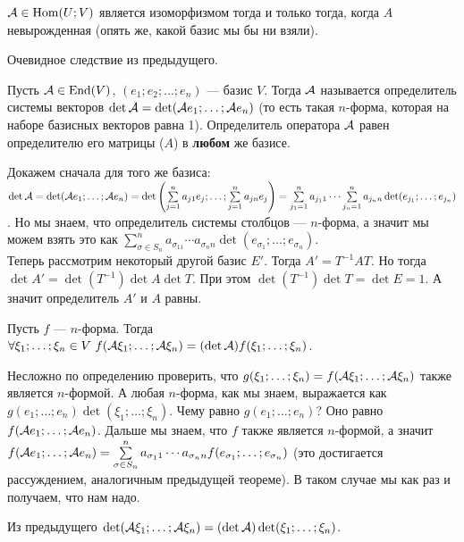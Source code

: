 \documentclass{article}
\begin{document}
\begin{itemize}
\begin{Proof}
        \end{Proof}
        \thm ${\mathcal{A}}\in\operatorname{Hom}(U;V)$ является изоморфизмом тогда и только тогда, когда $A$ невырожденная (опять же, какой базис мы бы ни взяли).
        \begin{Proof}
            Очевидное следствие из предыдущего.
        \end{Proof}
    \dfn Пусть ${\mathcal{A}}\in\operatorname{End}(V)$, $(e_1;e_2;\ldots;e_n)$ --- базис $V$. Тогда  ${\mathcal{A}}$ называется определитель системы векторов $\det{\mathcal{A}}=\det({\mathcal{A}} e_1;\ldots;{\mathcal{A}} e_n)$ (то есть такая $n$-форма, которая на наборе базисных векторов равна 1).
        \thm Определитель оператора ${\mathcal{A}}$ равен определителю его матрицы ($A$) в \textbf{любом} же базисе.
        \begin{Proof}
            Докажем сначала для того же базиса: $\det{\mathcal{A}}=\det({\mathcal{A}} e_1;\ldots;{\mathcal{A}} e_n)=\det\left(\sum\limits_{j=1}^na_{j1}e_j;\ldots;\sum\limits_{j=1}^na_{jn}e_j\right)=\sum\limits_{j_1=1}^na_{j_11}\cdots\sum\limits_{j_n=1}^na_{j_nn}\det(e_{j_1};\ldots;e_{j_n})$. Но мы знаем, что определитель системы столбцов --- $n$-форма, а значит мы можем взять это как $\sum\limits_{\sigma\in S_n}^na_{\sigma_11}\cdots a_{\sigma_nn}\det(e_{\sigma_1};\ldots;e_{\sigma_n})$.\\
            Теперь рассмотрим некоторый другой базис $E'$. Тогда $A'=T^{-1}AT$. Но тогда $\det A'=\det(T^{-1})\det A\det T$. При этом $\det(T^{-1})\det T=\det E=1$. А значит определитель $A'$ и $A$ равны.
        \end{Proof}
        \thm Пусть $f$ --- $n$-форма. Тогда $\forall\xi_1;\ldots;\xi_n\in V~f({\mathcal{A}}\xi_1;\ldots;{\mathcal{A}}\xi_n)=(\det{\mathcal{A}})f(\xi_1;\ldots;\xi_n)$.
        \begin{Proof}
            Несложно по определению проверить, что $g(\xi_1;\ldots;\xi_n)=f({\mathcal{A}}\xi_1;\ldots;{\mathcal{A}}\xi_n)$ также является $n$-формой. А любая $n$-форма, как мы знаем, выражается как $g(e_1;\ldots;e_n)\det(\xi_1;\ldots;\xi_n)$. Чему равно $g(e_1;\ldots;e_n)$? Оно равно $f({\mathcal{A}} e_1;\ldots;{\mathcal{A}} e_n)$. Дальше мы знаем, что $f$ также является $n$-формой, а значит $f({\mathcal{A}} e_1;\ldots;{\mathcal{A}} e_n)=\sum\limits_{\sigma\in S_n}^na_{\sigma_11}\cdots a_{\sigma_nn}f(e_{\sigma_1};\ldots;e_{\sigma_n})$ (это достигается рассуждением, аналогичным предыдущей теореме). В таком случае мы как раз и получаем, что нам надо.
        \end{Proof}
        \thm Из предыдущего $\det({\mathcal{A}}\xi_1;\ldots;{\mathcal{A}}\xi_n)=(\det{\mathcal{A}})\det(\xi_1;\ldots;\xi_n)$.

\end{itemize}
\end{document}
